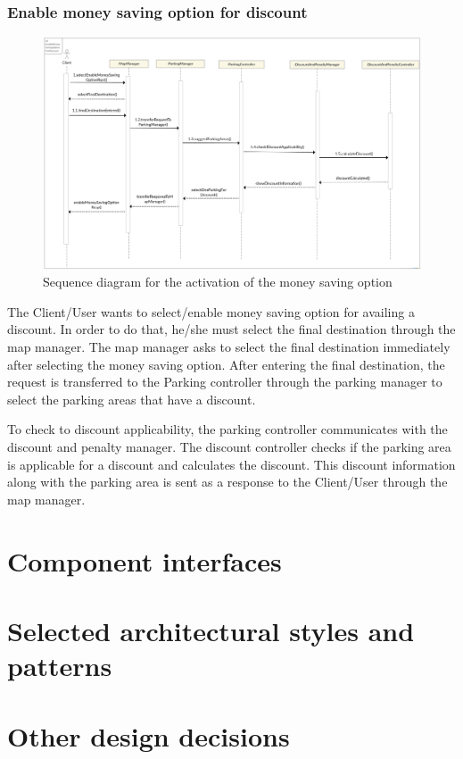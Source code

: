 \subsubsection{Enable money saving option for discount}
\begin{figure}[h]
	\centering
	\includegraphics[width=\linewidth,keepaspectratio]{figures/money_saving_option_runtime.eps}
	\caption{Sequence diagram for the activation of the money saving option}
	\label{fig:money_saving_option_runtime}
\end{figure}

The Client/User wants to select/enable money saving option for availing a discount. In order to do that, he/she must select the final destination through the map manager. The map manager asks to select the final destination immediately after selecting the money saving option. After entering the final destination, the request is transferred to the Parking controller through the parking manager to select the parking areas that have a discount.

To check to discount applicability, the parking controller communicates with the discount and penalty manager. The discount controller checks if the parking area is applicable for a discount and calculates the discount. This discount information along with the parking area is sent as a response to the Client/User through the map manager.

\section{Component interfaces}

\section{Selected architectural styles and patterns}

\section{Other design decisions}
